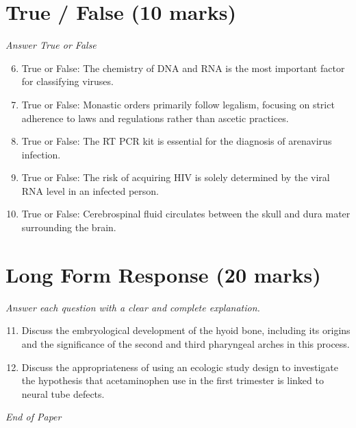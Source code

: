 \documentclass[12pt]{article}
\begin{document}
\section*{True / False (10 marks)}
\textit{Answer True or False}
\begin{enumerate}[label=\arabic*.]
\setcounter{enumi}{5}
\item True or False: The chemistry of DNA and RNA is the most important factor for classifying viruses.
\item True or False: Monastic orders primarily follow legalism, focusing on strict adherence to laws and regulations rather than ascetic practices.
\item True or False: The RT PCR kit is essential for the diagnosis of arenavirus infection.
\item True or False: The risk of acquiring HIV is solely determined by the viral RNA level in an infected person.
\item True or False: Cerebrospinal fluid circulates between the skull and dura mater surrounding the brain.
\end{enumerate}

\section*{Long Form Response (20 marks)}
\textit{Answer each question with a clear and complete explanation.}
\begin{enumerate}[label=\arabic*.]
\setcounter{enumi}{10}
\item Discuss the embryological development of the hyoid bone, including its origins and the significance of the second and third pharyngeal arches in this process.
\item Discuss the appropriateness of using an ecologic study design to investigate the hypothesis that acetaminophen use in the first trimester is linked to neural tube defects.
\end{enumerate}

\vfill
\noindent\textit{End of Paper}
\end{document}
